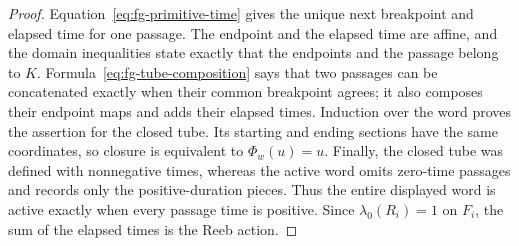 \begin{proof}
Equation~\eqref{eq:fg-primitive-time} gives the unique next breakpoint and
elapsed time for one passage.  The endpoint and the elapsed time are affine,
and the domain inequalities state exactly that the endpoints and the passage
belong to \(K\).  Formula~\eqref{eq:fg-tube-composition} says that two passages
can be concatenated exactly when their common breakpoint agrees; it also
composes their endpoint maps and adds their elapsed times.  Induction over the
word proves the assertion for the closed tube.  Its starting and ending
sections have the same coordinates, so closure is equivalent to
\(\Phi_w(u)=u\).  Finally, the closed tube was defined with nonnegative times,
whereas the active word omits zero-time passages and records only the
positive-duration pieces.  Thus the entire displayed word is active exactly
when every passage time is positive.  Since
\(\lambda_0(R_i)=1\) on \(F_i\), the sum of the elapsed times is the Reeb
action.
\end{proof}

